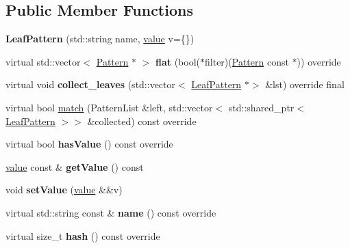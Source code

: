 \subsection*{Public Member Functions}
\begin{DoxyCompactItemize}
\item 
\mbox{\label{classdocopt_1_1LeafPattern_af9d71f5fdb74eddcb3150f9baaa815ce}} 
{\bfseries Leaf\+Pattern} (std\+::string name, \hyperlink{structdocopt_1_1value}{value} v=\{\})
\item 
\mbox{\label{classdocopt_1_1LeafPattern_a1bcf7e63fb2cac3e95999cb3ebd2282e}} 
virtual std\+::vector$<$ \hyperlink{classdocopt_1_1Pattern}{Pattern} $\ast$ $>$ {\bfseries flat} (bool($\ast$filter)(\hyperlink{classdocopt_1_1Pattern}{Pattern} const $\ast$)) override
\item 
\mbox{\label{classdocopt_1_1LeafPattern_afe958fb191f74b453d8fa6ef588ae8f2}} 
virtual void {\bfseries collect\+\_\+leaves} (std\+::vector$<$ \hyperlink{classdocopt_1_1LeafPattern}{Leaf\+Pattern} $\ast$$>$ \&lst) override final
\item 
virtual bool \hyperlink{classdocopt_1_1LeafPattern_a634a7028ce2c71ebb89586088034b7e2}{match} (Pattern\+List \&left, std\+::vector$<$ std\+::shared\+\_\+ptr$<$ \hyperlink{classdocopt_1_1LeafPattern}{Leaf\+Pattern} $>$$>$ \&collected) const override
\item 
\mbox{\label{classdocopt_1_1LeafPattern_aa410655d7bc5b2fa6676569f70065535}} 
virtual bool {\bfseries has\+Value} () const override
\item 
\mbox{\label{classdocopt_1_1LeafPattern_aa98d57a742abf8f194fe483e35ce5b67}} 
\hyperlink{structdocopt_1_1value}{value} const  \& {\bfseries get\+Value} () const
\item 
\mbox{\label{classdocopt_1_1LeafPattern_a44655164a427a6f6e0d98f1f30a88bac}} 
void {\bfseries set\+Value} (\hyperlink{structdocopt_1_1value}{value} \&\&v)
\item 
\mbox{\label{classdocopt_1_1LeafPattern_a1f93d0ff7fb9ad327bfcddcfb8738c4e}} 
virtual std\+::string const  \& {\bfseries name} () const override
\item 
\mbox{\label{classdocopt_1_1LeafPattern_a14d89a711b87a8d5d84a081a602d97b9}} 
virtual size\+\_\+t {\bfseries hash} () const override
\end{DoxyCompactItemize}
